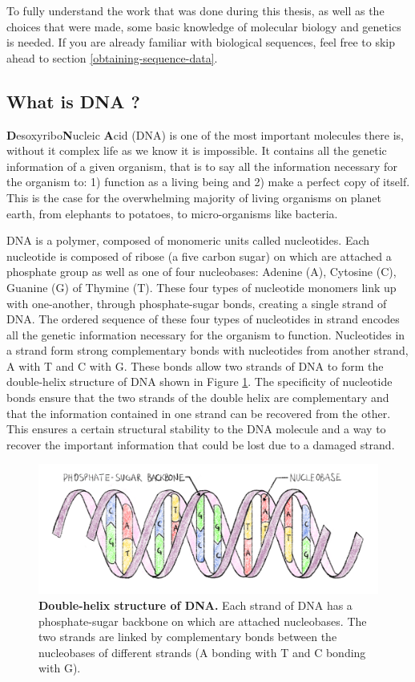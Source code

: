 \documentclass[
  11pt,
  twoside,
  BCOR=10mm,
  listof=totoc]{scrbook}
\newcommand{\extcaption}[2]{
    \caption[#1]{
        \textbf{#1}\newline
        #2
    }
}
\begin{document}
To fully understand the work that was done during this thesis, as well as the choices that were made, some basic knowledge of molecular biology and genetics is needed. If you are already familiar with biological sequences, feel free to skip ahead to section \ref{obtaining-sequence-data}.

\hypertarget{what-is-dna}{%
\subsection{What is DNA ?}\label{what-is-dna}}

\textbf{D}esoxyribo\textbf{N}ucleic \textbf{A}cid (DNA) is one of the most important molecules there is, without it complex life as we know it is impossible. It contains all the genetic information of a given organism, that is to say all the information necessary for the organism to: 1) function as a living being and 2) make a perfect copy of itself. This is the case for the overwhelming majority of living organisms on planet earth, from elephants to potatoes, to micro-organisms like bacteria.

DNA is a polymer, composed of monomeric units called nucleotides. Each nucleotide is composed of ribose (a five carbon sugar) on which are attached a phosphate group as well as one of four nucleobases: Adenine (A), Cytosine (C), Guanine (G) of Thymine (T). These four types of nucleotide monomers link up with one-another, through phosphate-sugar bonds, creating a single strand of DNA. The ordered sequence of these four types of nucleotides in strand encodes all the genetic information necessary for the organism to function. Nucleotides in a strand form strong complementary bonds with nucleotides from another strand, A with T and C with G. These bonds allow two strands of DNA to form the double-helix structure of DNA \autocite{watson1953} shown in Figure \ref{fig:figDNA}. The specificity of nucleotide bonds ensure that the two strands of the double helix are complementary and that the information contained in one strand can be recovered from the other. This ensures a certain structural stability to the DNA molecule and a way to recover the important information that could be lost due to a damaged strand.

\begin{figure}[h]
\centering
\includegraphics[width=\linewidth]{./figures/Sequence-Intro/DNA.png}
\extcaption{Double-helix structure of DNA.}{Each strand of DNA has a phosphate-sugar backbone on which are attached nucleobases. The two strands are linked by complementary bonds between the nucleobases of different strands (A bonding with T and C bonding with G).}
\label{fig:figDNA}
\end{figure}
\end{document}
